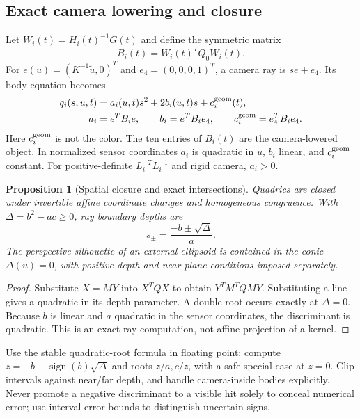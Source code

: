 \documentclass[10pt,letterpaper]{article}
\newtheorem{proposition}{Proposition}
\theoremstyle{remark}\newtheorem{counterexample}[proposition]{Counterexample}
\begin{document}
\subsection{Exact camera lowering and closure}
Let $W_i(t)=H_i(t)^{-1}G(t)$ and define the symmetric matrix
\begin{equation}
 B_i(t)=W_i(t)^TQ_0W_i(t). \label{eq:pullback}
\end{equation}
For $e(u)=(K^{-1}\widetilde u,0)^T$ and $e_4=(0,0,0,1)^T$, a camera ray is $s e+e_4$. Its body equation becomes
\begin{align}
 q_i(s,u,t)&=a_i(u,t)s^2+2b_i(u,t)s+c_i^{\rm geom}(t),\\
 a_i&=e^TB_ie,\qquad b_i=e^TB_ie_4,\qquad
 c_i^{\rm geom}=e_4^TB_ie_4. \label{eq:quadray}
\end{align}
Here $c_i^{\rm geom}$ is not the color. The ten entries of $B_i(t)$ are the camera-lowered object. In normalized sensor coordinates $a_i$ is quadratic in $u$, $b_i$ linear, and $c_i^{\rm geom}$ constant. For positive-definite $L_i^{-T}L_i^{-1}$ and rigid camera, $a_i>0$.

\begin{proposition}[Spatial closure and exact intersections]
Quadrics are closed under invertible affine coordinate changes and homogeneous congruence. With $\Delta=b^2-ac\geq0$, ray boundary depths are
\begin{equation}
 s_\pm=\frac{-b\pm\sqrt\Delta}{a}. \label{eq:roots}
\end{equation}
The perspective silhouette of an external ellipsoid is contained in the conic $\Delta(u)=0$, with positive-depth and near-plane conditions imposed separately.
\end{proposition}
\begin{proof}
Substitute $X=MY$ into $X^TQX$ to obtain $Y^TM^TQMY$. Substituting a line gives a quadratic in its depth parameter. A double root occurs exactly at $\Delta=0$. Because $b$ is linear and $a$ quadratic in the sensor coordinates, the discriminant is quadratic. This is an exact ray computation, not affine projection of a kernel.
\end{proof}
Use the stable quadratic-root formula in floating point: compute $z=-b-\operatorname{sign}(b)\sqrt\Delta$ and roots $z/a,c/z$, with a safe special case at $z=0$. Clip intervals against near/far depth, and handle camera-inside bodies explicitly. Never promote a negative discriminant to a visible hit solely to conceal numerical error; use interval error bounds to distinguish uncertain signs.
\end{document}
